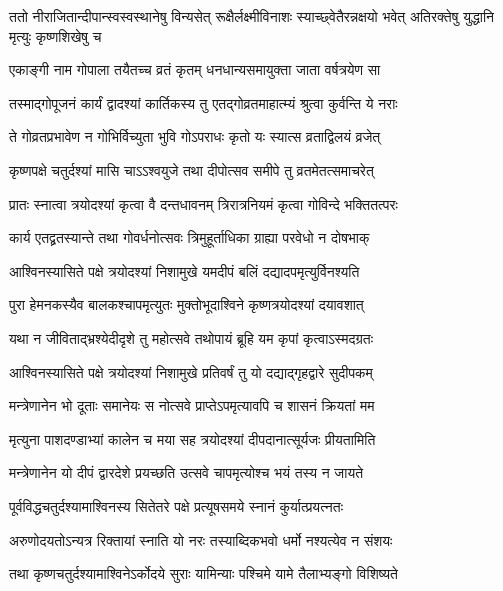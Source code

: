 \threelineshloka
{ततो नीराजितान्दीपान्स्वस्वस्थानेषु विन्यसेत्}
{रूक्षैर्लक्ष्मीविनाशः स्याच्छ्वेतैरन्नक्षयो भवेत्}
{अतिरक्तेषु युद्धानि मृत्युः कृष्णशिखेषु च} %

\twolineshloka
{एकाङ्गी नाम गोपाला तयैतच्च व्रतं कृतम्}
{धनधान्यसमायुक्ता जाता वर्षत्रयेण सा} %

\twolineshloka
{तस्माद्गोपूजनं कार्यं द्वादश्यां कार्तिकस्य तु}
{एतद्गोव्रतमाहात्म्यं श्रुत्वा कुर्वन्ति ये नराः} %

\twolineshloka
{ते गोव्रतप्रभावेण न गोभिर्विच्युता भुवि}
{गोऽपराधः कृतो यः स्यात्स व्रताद्विलयं व्रजेत्} %


\twolineshloka
{कृष्णपक्षे चतुर्दश्यां मासि चाऽऽश्वयुजे तथा}
{दीपोत्सव समीपे तु व्रतमेतत्समाचरेत्} %

\twolineshloka
{प्रातः स्नात्वा त्रयोदश्यां कृत्वा वै दन्तधावनम्}
{त्रिरात्रनियमं कृत्वा गोविन्दे भक्तितत्परः} %

\twolineshloka
{कार्य एतद्व्रतस्यान्ते तथा गोवर्धनोत्सवः}
{त्रिमुहूर्ताधिका ग्राह्या परवेधो न दोषभाक्} %

\twolineshloka
{आश्विनस्यासिते पक्षे त्रयोदश्यां निशामुखे}
{यमदीपं बलिं दद्यादपमृत्युर्विनश्यति} %

\twolineshloka
{पुरा हेमनकस्यैव बालकश्चापमृत्युतः}
{मुक्तोभूदाश्विने कृष्णत्रयोदश्यां दयावशात्} %

\twolineshloka
{यथा न जीविताद्भ्रश्येदीदृशे तु महोत्सवे}
{तथोपायं ब्रूहि यम कृपां कृत्वाऽस्मदग्रतः} %


\twolineshloka
{आश्विनस्यासिते पक्षे त्रयोदश्यां निशामुखे}
{प्रतिवर्षं तु यो दद्याद्गृहद्वारे सुदीपकम्} %

\twolineshloka
{मन्त्रेणानेन भो दूताः समानेयः स नोत्सवे}
{प्राप्तेऽपमृत्यावपि च शासनं क्रियतां मम} %

\twolineshloka
{मृत्युना पाशदण्डाभ्यां कालेन च मया सह}
{त्रयोदश्यां दीपदानात्सूर्यजः प्रीयतामिति} %

\twolineshloka
{मन्त्रेणानेन यो दीपं द्वारदेशे प्रयच्छति}
{उत्सवे चापमृत्योश्च भयं तस्य न जायते} %


\twolineshloka
{पूर्वविद्धचतुर्दश्यामाश्विनस्य सितेतरे}
{पक्षे प्रत्यूषसमये स्नानं कुर्यात्प्रयत्नतः} %

\twolineshloka
{अरुणोदयतोऽन्यत्र रिक्तायां स्नाति यो नरः}
{तस्याब्दिकभवो धर्मो नश्यत्येव न संशयः} %

\twolineshloka
{तथा कृष्णचतुर्दश्यामाश्विनेऽर्कोदये सुराः}
{यामिन्याः पश्चिमे यामे तैलाभ्यङ्गो विशिष्यते} %

